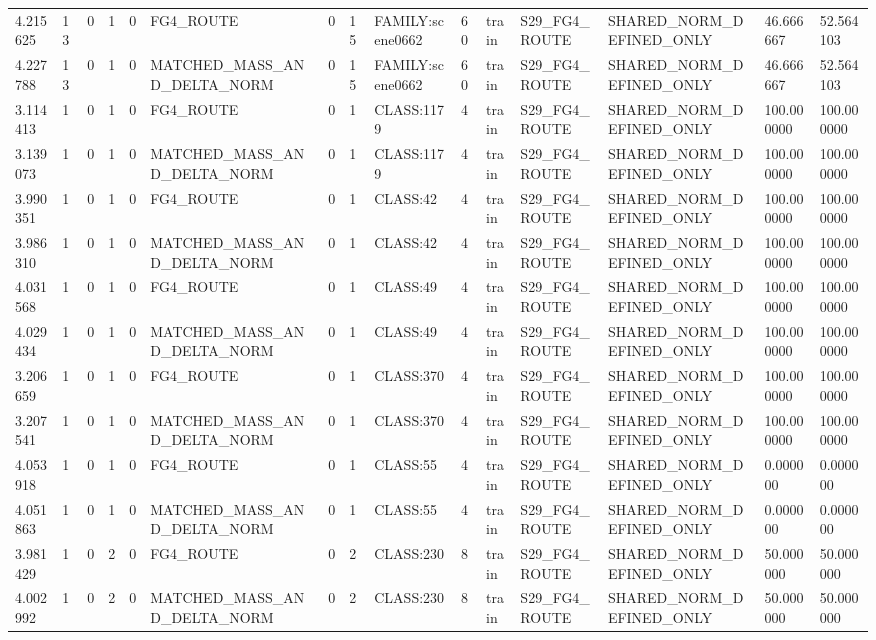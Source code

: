 \begin{tabular}{lllllllllllllll}
4.215625 & 13 & 0 & 1 & 0 & FG4\_ROUTE & 0 & 15 & FAMILY:scene0662 & 60 & train & S29\_FG4\_ROUTE & SHARED\_NORM\_DEFINED\_ONLY & 46.666667 & 52.564103 \\
4.227788 & 13 & 0 & 1 & 0 & MATCHED\_MASS\_AND\_DELTA\_NORM & 0 & 15 & FAMILY:scene0662 & 60 & train & S29\_FG4\_ROUTE & SHARED\_NORM\_DEFINED\_ONLY & 46.666667 & 52.564103 \\
3.114413 & 1 & 0 & 1 & 0 & FG4\_ROUTE & 0 & 1 & CLASS:1179 & 4 & train & S29\_FG4\_ROUTE & SHARED\_NORM\_DEFINED\_ONLY & 100.000000 & 100.000000 \\
3.139073 & 1 & 0 & 1 & 0 & MATCHED\_MASS\_AND\_DELTA\_NORM & 0 & 1 & CLASS:1179 & 4 & train & S29\_FG4\_ROUTE & SHARED\_NORM\_DEFINED\_ONLY & 100.000000 & 100.000000 \\
3.990351 & 1 & 0 & 1 & 0 & FG4\_ROUTE & 0 & 1 & CLASS:42 & 4 & train & S29\_FG4\_ROUTE & SHARED\_NORM\_DEFINED\_ONLY & 100.000000 & 100.000000 \\
3.986310 & 1 & 0 & 1 & 0 & MATCHED\_MASS\_AND\_DELTA\_NORM & 0 & 1 & CLASS:42 & 4 & train & S29\_FG4\_ROUTE & SHARED\_NORM\_DEFINED\_ONLY & 100.000000 & 100.000000 \\
4.031568 & 1 & 0 & 1 & 0 & FG4\_ROUTE & 0 & 1 & CLASS:49 & 4 & train & S29\_FG4\_ROUTE & SHARED\_NORM\_DEFINED\_ONLY & 100.000000 & 100.000000 \\
4.029434 & 1 & 0 & 1 & 0 & MATCHED\_MASS\_AND\_DELTA\_NORM & 0 & 1 & CLASS:49 & 4 & train & S29\_FG4\_ROUTE & SHARED\_NORM\_DEFINED\_ONLY & 100.000000 & 100.000000 \\
3.206659 & 1 & 0 & 1 & 0 & FG4\_ROUTE & 0 & 1 & CLASS:370 & 4 & train & S29\_FG4\_ROUTE & SHARED\_NORM\_DEFINED\_ONLY & 100.000000 & 100.000000 \\
3.207541 & 1 & 0 & 1 & 0 & MATCHED\_MASS\_AND\_DELTA\_NORM & 0 & 1 & CLASS:370 & 4 & train & S29\_FG4\_ROUTE & SHARED\_NORM\_DEFINED\_ONLY & 100.000000 & 100.000000 \\
4.053918 & 1 & 0 & 1 & 0 & FG4\_ROUTE & 0 & 1 & CLASS:55 & 4 & train & S29\_FG4\_ROUTE & SHARED\_NORM\_DEFINED\_ONLY & 0.000000 & 0.000000 \\
4.051863 & 1 & 0 & 1 & 0 & MATCHED\_MASS\_AND\_DELTA\_NORM & 0 & 1 & CLASS:55 & 4 & train & S29\_FG4\_ROUTE & SHARED\_NORM\_DEFINED\_ONLY & 0.000000 & 0.000000 \\
3.981429 & 1 & 0 & 2 & 0 & FG4\_ROUTE & 0 & 2 & CLASS:230 & 8 & train & S29\_FG4\_ROUTE & SHARED\_NORM\_DEFINED\_ONLY & 50.000000 & 50.000000 \\
4.002992 & 1 & 0 & 2 & 0 & MATCHED\_MASS\_AND\_DELTA\_NORM & 0 & 2 & CLASS:230 & 8 & train & S29\_FG4\_ROUTE & SHARED\_NORM\_DEFINED\_ONLY & 50.000000 & 50.000000 \\

\end{tabular}
